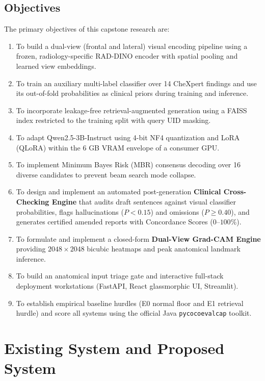 \documentclass[12pt,a4paper]{report}
\begin{document}
\section{Objectives}
The primary objectives of this capstone research are:
\begin{enumerate}
    \item To build a dual-view (frontal and lateral) visual encoding pipeline using a frozen, radiology-specific RAD-DINO encoder with spatial pooling and learned view embeddings.
    \item To train an auxiliary multi-label classifier over 14 CheXpert findings and use its out-of-fold probabilities as clinical priors during training and inference.
    \item To incorporate leakage-free retrieval-augmented generation using a FAISS index restricted to the training split with query UID masking.
    \item To adapt Qwen2.5-3B-Instruct using 4-bit NF4 quantization and LoRA (QLoRA) within the 6 GB VRAM envelope of a consumer GPU.
    \item To implement Minimum Bayes Risk (MBR) consensus decoding over 16 diverse candidates to prevent beam search mode collapse.
    \item To design and implement an automated post-generation \textbf{Clinical Cross-Checking Engine} that audits draft sentences against visual classifier probabilities, flags hallucinations ($P < 0.15$) and omissions ($P \ge 0.40$), and generates certified amended reports with Concordance Scores ($0$--$100\%$).
    \item To formulate and implement a closed-form \textbf{Dual-View Grad-CAM Engine} providing $2048 \times 2048$ bicubic heatmaps and peak anatomical landmark inference.
    \item To build an anatomical input triage gate and interactive full-stack deployment workstations (FastAPI, React glassmorphic UI, Streamlit).
    \item To establish empirical baseline hurdles (E0 normal floor and E1 retrieval hurdle) and score all systems using the official Java \texttt{pycocoevalcap} toolkit.
\end{enumerate}

\chapter{Existing System and Proposed System}
\end{document}
